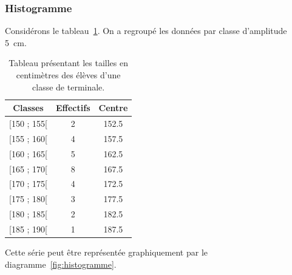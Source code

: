                   \subsubsection{Histogramme}
                        Consid\'erons le tableau~\ref{tab:variable continue}.
                        On a regroup\'e les donn\'ees par classe d'amplitude 5~cm. \newline
                        \begin{table}[h!]
                        \centering
                              \begin{tabular}{|c|c|c|}
                              \hline
                              Classes       & Effectifs    & Centre  \\
                              \hline
                              [150 ; 155[   &       2      &  152.5  \\
                              \hline
                              [155 ; 160[   &       4      &  157.5  \\
                              \hline
                              [160 ; 165[   &       5      &  162.5  \\
                              \hline
                              [165 ; 170[   &       8      &  167.5  \\
                              \hline
                              [170 ; 175[   &       4      &  172.5  \\
                              \hline
                              [175 ; 180[   &       3      &  177.5  \\
                              \hline
                              [180 ; 185[   &       2      &  182.5  \\
                              \hline
                              [185 ; 190[   &       1      &  187.5  \\
                              \hline
                              \end{tabular}
                        \caption{Tableau pr\'esentant les tailles en centim\`etres des \'el\`eves d'une classe de terminale.}
                        \label{tab:variable continue}
                        \end{table}
                        Cette s\'erie peut \^etre repr\'esent\'ee graphiquement par le diagramme~\ref{fig:histogramme}.
